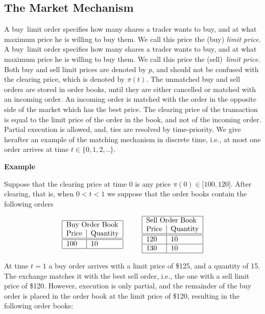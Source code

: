 \documentclass{article}
\begin{document}
\subsection{The Market Mechanism}

\noindent A buy\ limit order specifies how many shares a trader wants to
buy, and at what maximum price he is willing to buy them. We call this price
the (buy) \textit{limit price}. A buy\ limit order specifies how many shares
a trader wants to buy, and at what maximum price he is willing to buy them.
We call this price the (sell)\ \textit{limit price}. Both buy and sell limit
prices are denoted by $p$, and should not be confused with the clearing
price, which is denoted by $\pi (t)$. The unmatched buy and sell orders are
stored in order books, until they are either cancelled or matched with an
incoming order. An incoming order is matched with the order in the opposite
side of the market which has the best price. The clearing price of the
transaction is equal to the limit price of the order in the book, and not of
the incoming order. Partial execution is allowed, and, ties are resolved by
time-priority. We give herafter an example of the matching mechanism in
discrete time, i.e., at most one order arrives at time $t\in \{0,1,2,..\}.$

\textbf{Example}

Suppose that the clearing price at time $0$ is any price $\pi (0)\in \lbrack
100,120]$. After clearing, that is, when $0<t<1$ we suppose that the order
books contain the following orders

\begin{equation*}
\begin{tabular}{|l|l|}
\hline
\multicolumn{2}{|l|}{Buy Order Book} \\
Price & Quantity \\ \hline\hline
100 & 10 \\ \hline
\end{tabular}%
\text{ \ \ \ \ \ }%
\begin{tabular}{|l|l|}
\hline
\multicolumn{2}{|l|}{Sell Order Book} \\
Price & Quantity \\ \hline\hline
120 & 10 \\ \hline
130 & 10 \\ \hline
\end{tabular}%
\end{equation*}

At time $t=1$ a buy order arrives with a limit price of \$125, and a
quantity of 15. The exchange matches it with the best sell order, i.e., the
one with a sell limit price of \$120. However, execution is only partial,
and the remainder of the buy order is placed in the order book at the limit
price of \$120, resulting in the following order books:
\end{document}
